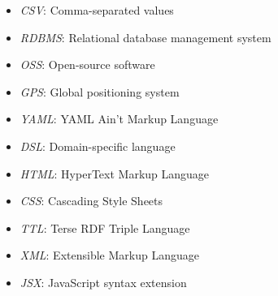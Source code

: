 \documentclass[12pt,a4paper]{report}
\let\openright=\clearpage
\begin{document}



\tableofcontents















\listoffigures

\listoftables

\begin{itemize}
\item \emph{CSV}: Comma-separated values
\item \emph{RDBMS}: Relational database management system
\item \emph{OSS}: Open-source software
\item \emph{GPS}: Global positioning system
\item \emph{YAML}: YAML Ain't Markup Language
\item \emph{DSL}: Domain-specific language
\item \emph{HTML}: HyperText Markup Language
\item \emph{CSS}: Cascading Style Sheets
\item \emph{TTL}: Terse RDF Triple Language
\item \emph{XML}: Extensible Markup Language
\item \emph{JSX}: JavaScript syntax extension
\end{itemize}

\appendix


\openright
\end{document}
